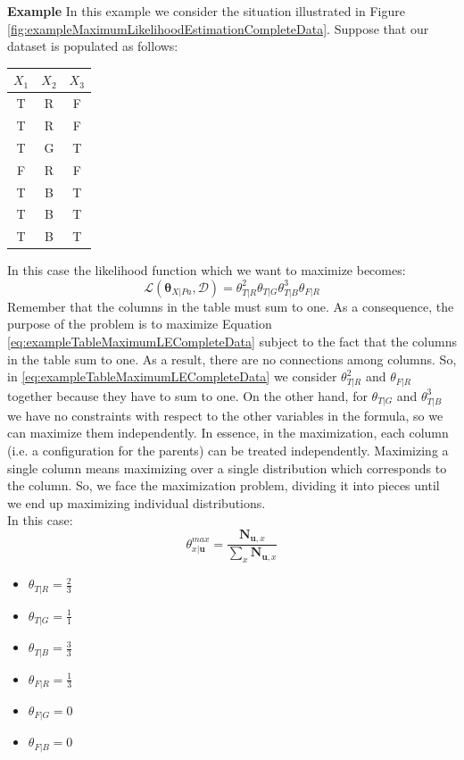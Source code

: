 \textbf{Example} \newline
In this example we consider the situation illustrated in Figure \ref{fig:exampleMaximumLikelihoodEstimationCompleteData}. Suppose that our dataset is populated as follows:
\begin{center}
\begin{tabular}{ |c|c|c| } 
 $X_1$ & $X_2$ & $X_3$ \\
 \hline
 T & R & F \\ 
 T & R & F \\ 
 T & G & T \\ 
 F & R & F \\ 
 T & B & T \\ 
 T & B & T \\
 T & B  & T \\ 
\end{tabular}
\end{center}
In this case the likelihood function which we want to maximize becomes:
\begin{equation}
  \label{eq:exampleTableMaximumLECompleteData}
  \mathcal{L}(\pmb{\theta}_{X|\mathit{Pa}}, \mathcal{D}) = \theta^2_{T|R} \theta_{T|G} \theta^3_{T|B} \theta_{F|R}  
\end{equation}
Remember that the columns in the table must sum to one. As a consequence, the purpose of the problem is to maximize Equation \ref{eq:exampleTableMaximumLECompleteData} subject to the fact that the columns in the table sum to one. As a result, there are no connections among columns. So, in \ref{eq:exampleTableMaximumLECompleteData} we consider $\theta^2_{T|R}$ and $\theta_{F|R}$ together because they have to sum to one. On the other hand, for $\theta_{T|G}$ and $\theta^3_{T|B}$ we have no constraints with respect to the other variables in the formula, so we can maximize them independently. In essence, in the maximization, each column (i.e. a configuration for the parents) can be treated independently. Maximizing a single column means maximizing over a single distribution which corresponds to the column. So, we face the maximization problem, dividing it into pieces until we end up maximizing individual distributions. \\
In this case:
\begin{equation}
  \label{eq:parameterMaximizationGraphicalModel}
  \theta^{\mathit{max}}_{x|\pmb{u}} = \frac{\pmb{N}_{\pmb{u},x}}{\sum_x \pmb{N}_{\pmb{u},x}}  
\end{equation}
\begin{itemize}
    \item $\theta_{T|R} = \frac{2}{3}$
    \item $\theta_{T|G} = \frac{1}{1}$
    \item $\theta_{T|B} = \frac{3}{3}$
    \item $\theta_{F|R} = \frac{1}{3}$
    \item $\theta_{F|G} = 0$
    \item $\theta_{F|B} = 0$
\end{itemize}

